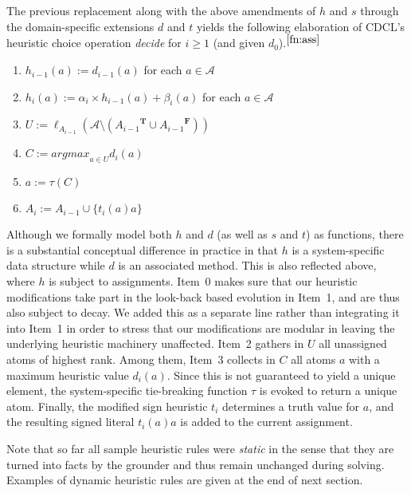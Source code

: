\documentclass[letterpaper]{article}
\newcommand{\true}{\ensuremath{\boldsymbol{T}}}
\newcommand{\false}{\ensuremath{\boldsymbol{F}}}
\newcommand{\ass}{\ensuremath{A}}
\newcommand{\tlits}[1]{\ensuremath{{#1}^{\true}}}
\newcommand{\flits}[1]{\ensuremath{{#1}^{\false}}}
\begin{document}
The previous replacement along with the above amendments of $h$ and $s$ through the domain-specific extensions $d$ and $t$
yields the following elaboration of CDCL's heuristic choice operation \textit{decide} for $i\geq 1$ (and given $d_0$).$^{\ref{fn:ass}}$
\begin{enumerate}\addtocounter{enumi}{-1}\itemindent 10pt
\item $h_{i-1}(a) := d_{i-1}(a)$                         \hfill for each $a\in\mathcal{A}\qquad$
\item $h_i(a) := \alpha_i\times h_{i-1}(a) + \beta_i(a)$ \hfill for each $a\in\mathcal{A}\qquad$
\item $U:=\ell_{\ass_{i-1}}(\mathcal{A}\setminus (\tlits{\ass_{i-1}}\cup\flits{\ass_{i-1}}))$
\item $C:= \textit{argmax}_{a\in U}d_i(a)$
\item $a:= \tau(C)$
\item $\ass_i := \ass_{i-1}\cup\{t_i(a)a\}$
\end{enumerate}
Although we formally model both $h$ and $d$ (as well as $s$ and $t$) as functions,
there is a substantial conceptual difference in practice in that $h$ is a system-specific data structure while $d$ is an associated method.
This is also reflected above, where $h$ is subject to assignments.
%
Item~0 makes sure that our heuristic modifications take part in the look-back based evolution in Item~1,
and are thus also subject to decay.
We added this as a separate line rather than integrating it into Item~1 in order to stress that our
modifications are modular in leaving the underlying heuristic machinery unaffected.
%
Item~2 gathers in $U$ all unassigned atoms of highest rank.
%
Among them, Item~3 collects in $C$ all atoms $a$ with a maximum heuristic value $d_i(a)$.
%
Since this is not guaranteed to yield a unique element, the system-specific tie-breaking function
$\tau$ is evoked to return a unique atom.
%
Finally, the modified sign heuristic $t_i$ determines a truth value for $a$, and the resulting
signed literal ${t_i(a)a}$ is added to the current assignment.

Note that so far all sample heuristic rules were \emph{static} in the sense that they are turned into
facts by the grounder and thus remain unchanged during solving.
Examples of dynamic heuristic rules are given at the end of next section.
\end{document}

